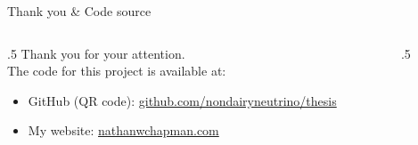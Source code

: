 \documentclass[aspectratio=169]{beamer}
\begin{document}
\begin{frame}{Thank you \& Code source}
    \begin{columns}[onlytextwidth]
        \begin{column}{.5\textwidth}
            Thank you for your attention.
            \vspace*{0.1\textheight} \\
            The code for this project is available at:
            \begin{itemize}
                \item GitHub (QR code): \url{github.com/nondairyneutrino/thesis}
                \item My website: \url{nathanwchapman.com}
            \end{itemize}
        \end{column}
        \begin{column}{.5\textwidth}
            \centering
        \end{column}
    \end{columns}
    \end{frame}

\begin{frame}[allowframebreaks]
    \frametitle{\bibname}
    \nocite{*}
    \printbibliography
\end{frame}
\end{document}
